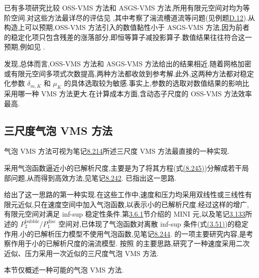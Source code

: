 \begin{note}[数值经验]
\label{note:vms-oss-numerical-experience}
已有多项研究比较 OSS-VMS 方法和 ASGS-VMS 方法,所用有限元空间对均为等阶空间.对这些方法最详尽的评估见 \textcite{ColomesBadiaCodinaPrincipe2015},其中考察了湍流槽道流等问题(见例题\hyperref[ex:appendix-d-12]{D.12}).从构造上可以预期,OSS-VMS 方法引入的数值黏性小于 ASGS-VMS 方法,因为前者的稳定化项只包含残差的涨落部分,即恒等算子减投影算子.数值结果往往符合这一预期,例如见 \textcite{Codina2008}.

\textcite{ColomesBadiaCodinaPrincipe2015}发现,总体而言,OSS-VMS 方法和 ASGS-VMS 方法给出的结果相近.随着网格加密或有限元空间多项式次数提高,两种方法都收敛到参考解.此外,这两种方法都对稳定化参数 $\delta_{m,K}$ 和 $\mu_K$ 的具体选取较为敏感.事实上,参数的选取对数值结果的影响比采用哪一种 VMS 方法更大.在计算成本方面,含动态子尺度的 OSS-VMS 方法效率最高.
\end{note}

\subsection{三尺度气泡 VMS 方法}\label{subsec:vms-bubble-functions}

\begin{note}
\label{note:vms-bubble-realizations}
气泡 VMS 方法可视为笔记\hyperref[note:vms-three-scale-approach]{8.214}所述三尺度 VMS 方法最直接的一种实现.

采用气泡函数逼近小的已解析尺度,主要是为了将其方程(式\hyperref[eq:vms-three-scale-model-small]{(8.245)})分解成若干局部问题,从而得到高效方法,见笔记\hyperref[note:vms-bubble-localization]{8.242}.\textcite{HughesMazzeiJansen2000} 已指出这一思路.

\textcite{GravemeierWallRamm2004,GravemeierWallRamm2005,Gravemeier2006c} 给出了这一思路的第一种实现.在这些工作中,速度和压力均采用双线性或三线性有限元近似,只在速度空间中加入气泡函数,以表示小的已解析尺度.经过这样的增广,有限元空间对满足 inf-sup 稳定性条件.第\hyperref[subsec:mini-element]{3.6.1}节介绍的 MINI 元,以及笔记\hyperref[note:bubble-discontinuous-pressure-pairs]{3.133}所述的 $P_2^{\mathrm{bubble}}/P_1^{\mathrm{disc}}$ 空间对,已体现了气泡函数对离散 inf-sup 条件(式\hyperref[eq:discrete-infsup-condition]{(3.51)})的稳定作用.小的已解析压力模型不使用气泡函数,见笔记\hyperref[note:vms-bubble-pressure-model]{8.244}.\textcite{GravemeierWallRamm2004,GravemeierWallRamm2005,Gravemeier2006c} 的一项主要研究内容,是考察作用于小的已解析尺度的湍流模型.\textcite{JohnKindl2010a} 按照 \textcite{GravemeierWallRamm2004,GravemeierWallRamm2005} 的主要思路,研究了一种速度采用二次近似、压力采用一次近似的三尺度气泡 VMS 方法.

本节仅概述一种可能的气泡 VMS 方法.
\end{note}

